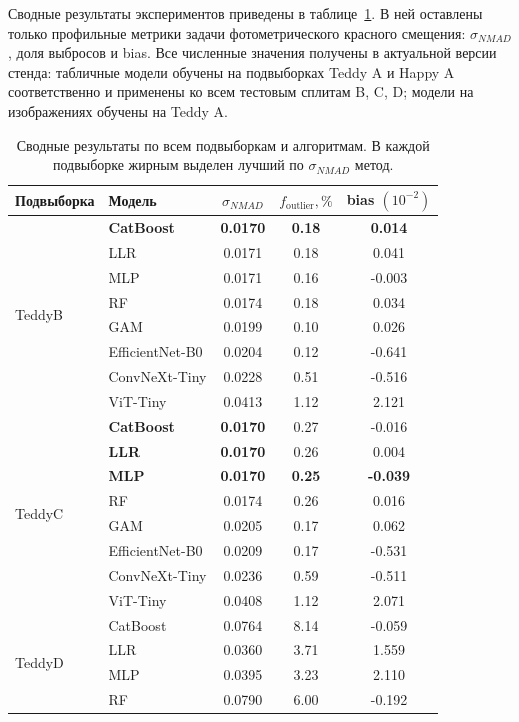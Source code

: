 \documentclass[12pt,a4paper]{article}
\begin{document}
Сводные результаты экспериментов приведены в таблице~\ref{tab:all-results}. В ней оставлены только профильные метрики задачи фотометрического красного смещения: $\sigma_{NMAD}$, доля выбросов и bias. Все численные значения получены в актуальной версии стенда: табличные модели обучены на подвыборках Teddy A и Happy A соответственно и применены ко всем тестовым сплитам B, C, D; модели на изображениях обучены на Teddy A.

\begin{table}[htbp]
\centering
\caption{Сводные результаты по всем подвыборкам и алгоритмам. В каждой подвыборке жирным выделен лучший по $\sigma_{NMAD}$ метод.}
\label{tab:all-results}
\small
\begin{tabular}{|l|l|c|c|c|}
\hline
Подвыборка & Модель & $\sigma_{NMAD}$ & $f_{\mathrm{outlier}}, \%$ & bias $(10^{-2})$ \\
\hline
\multirow{8}{*}{TeddyB} & \textbf{CatBoost} & \textbf{0.0170} & \textbf{0.18} & \textbf{0.014} \\
 & LLR & 0.0171 & 0.18 & 0.041 \\
 & MLP & 0.0171 & 0.16 & -0.003 \\
 & RF & 0.0174 & 0.18 & 0.034 \\
 & GAM & 0.0199 & 0.10 & 0.026 \\
 & EfficientNet-B0 & 0.0204 & 0.12 & -0.641 \\
 & ConvNeXt-Tiny & 0.0228 & 0.51 & -0.516 \\
 & ViT-Tiny & 0.0413 & 1.12 & 2.121 \\
\hline
\multirow{8}{*}{TeddyC} & \textbf{CatBoost} & \textbf{0.0170} & 0.27 & -0.016 \\
 & \textbf{LLR} & \textbf{0.0170} & 0.26 & 0.004 \\
 & \textbf{MLP} & \textbf{0.0170} & \textbf{0.25} & \textbf{-0.039} \\
 & RF & 0.0174 & 0.26 & 0.016 \\
 & GAM & 0.0205 & 0.17 & 0.062 \\
 & EfficientNet-B0 & 0.0209 & 0.17 & -0.531 \\
 & ConvNeXt-Tiny & 0.0236 & 0.59 & -0.511 \\
 & ViT-Tiny & 0.0408 & 1.12 & 2.071 \\
\hline
\multirow{8}{*}{TeddyD} & CatBoost & 0.0764 & 8.14 & -0.059 \\
 & LLR & 0.0360 & 3.71 & 1.559 \\
 & MLP & 0.0395 & 3.23 & 2.110 \\
 & RF & 0.0790 & 6.00 & -0.192 \\

\end{tabular}
\end{table}
\end{document}
